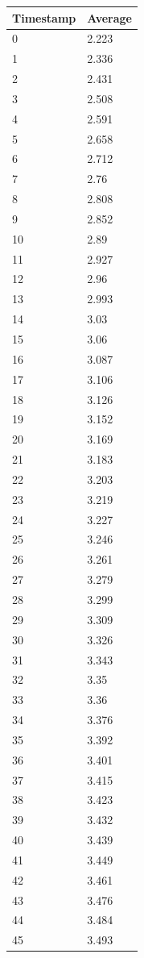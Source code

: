 %
%
\begin{tabular}{|l||l|}
\hline
	\textbf{Timestamp} & \textbf{Average} \\ \hline
	0 & 2.223 \\ \hline
	1 & 2.336 \\ \hline
	2 & 2.431 \\ \hline
	3 & 2.508 \\ \hline
	4 & 2.591 \\ \hline
	5 & 2.658 \\ \hline
	6 & 2.712 \\ \hline
	7 & 2.76 \\ \hline
	8 & 2.808 \\ \hline
	9 & 2.852 \\ \hline
	10 & 2.89 \\ \hline
	11 & 2.927 \\ \hline
	12 & 2.96 \\ \hline
	13 & 2.993 \\ \hline
	14 & 3.03 \\ \hline
	15 & 3.06 \\ \hline
	16 & 3.087 \\ \hline
	17 & 3.106 \\ \hline
	18 & 3.126 \\ \hline
	19 & 3.152 \\ \hline
	20 & 3.169 \\ \hline
	21 & 3.183 \\ \hline
	22 & 3.203 \\ \hline
	23 & 3.219 \\ \hline
	24 & 3.227 \\ \hline
	25 & 3.246 \\ \hline
	26 & 3.261 \\ \hline
	27 & 3.279 \\ \hline
	28 & 3.299 \\ \hline
	29 & 3.309 \\ \hline
	30 & 3.326 \\ \hline
	31 & 3.343 \\ \hline
	32 & 3.35 \\ \hline
	33 & 3.36 \\ \hline
	34 & 3.376 \\ \hline
	35 & 3.392 \\ \hline
	36 & 3.401 \\ \hline
	37 & 3.415 \\ \hline
	38 & 3.423 \\ \hline
	39 & 3.432 \\ \hline
	40 & 3.439 \\ \hline
	41 & 3.449 \\ \hline
	42 & 3.461 \\ \hline
	43 & 3.476 \\ \hline
	44 & 3.484 \\ \hline
	45 & 3.493 \\ \hline
\end{tabular}
